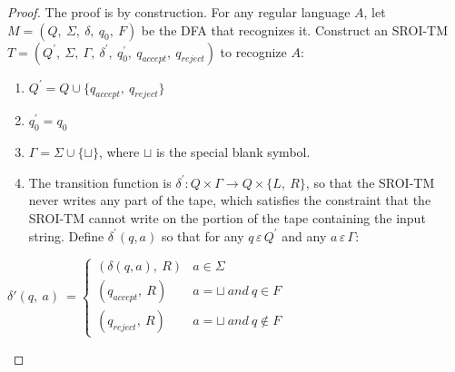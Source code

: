 \documentclass[11pt]{article}
\begin{document}
\begin{proof}
The proof is by construction. For any regular language $A$, let $M = (Q, \ \Sigma, \ \delta, \ q_0, \ F)$ be the DFA that recognizes it. Construct an SROI-TM $T = (Q^{'}, \ \Sigma, \ \Gamma, \ \delta^{'}, \ q_0^{'}, \ q_{accept}, \ q_{reject})$ to recognize $A$:
\begin{enumerate}
\item $Q^{'} = Q \cup \{q_{accept}, \ q_{reject}\}$
\item $q_0^{'} = q_0$
\item $\Gamma = \Sigma \cup \{\sqcup\}$, where $\sqcup$ is the special blank symbol.
\item The transition function is $\delta^{'} : Q \times \Gamma \longrightarrow Q \times \{L, \ R\}$, so that the SROI-TM never writes any part of the tape, which satisfies the constraint that the SROI-TM cannot write on the portion of the tape containing the input string. Define $\delta^{'}(q, a)$ so that for any $q \, \varepsilon \, Q^{'}$ and any $a \,  \varepsilon \, \Gamma$:
\end{enumerate}
\begin{center}
$\displaystyle \delta '( q,\ a) \ =\begin{cases}
(\delta(q,a), \ R) & a \in \Sigma \\
(q_{accept}, \ R) & a = \sqcup \ and \ q \in F \\
(q_{reject}, \ R) & a = \sqcup \ and \ q \notin F
\end{cases} \ \ $
\end{center}
\end{proof}
\end{document}

